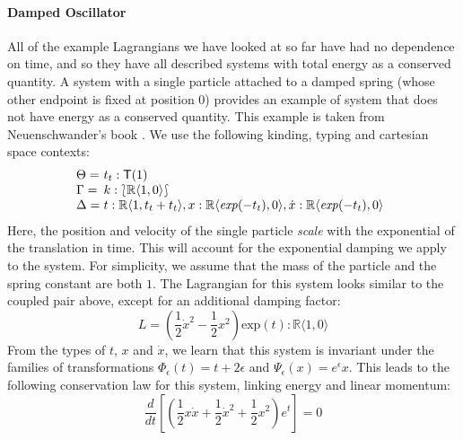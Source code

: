 \documentclass[preprint]{sigplanconf}
\newcommand{\typeOfCartSp}[1]{\lbag #1 \rbag}
\theoremstyle{examplestyle}
\begin{document}

\paragraph{Damped Oscillator} All of the example Lagrangians we have
looked at so far have had no dependence on time, and so they have all
described systems with total energy as a conserved quantity. A system
with a single particle attached to a damped spring (whose other
endpoint is fixed at position $0$) provides an example of system that
does not have energy as a conserved quantity. This example is taken
from Neuenschwander's book \cite{neuenschwander11}.  We use the
following kinding, typing and cartesian space contexts:
\begin{displaymath}
  \begin{array}{l@{\hspace{0.3em}}l}
    \Theta = & t_t : \mathsf{T}(1) \\
    \Gamma = & k : \typeOfCartSp{\mathbb{R}\langle 1, 0 \rangle} \\
    \Delta = &
    \begin{array}[t]{@{}l}
      t : \mathbb{R}\langle 1, t_t + t_t \rangle, x : \mathbb{R}\langle \mathit{exp}(-t_t), 0 \rangle, \dot{x} : \mathbb{R}\langle \mathit{exp}(-t_t), 0 \rangle
    \end{array}
  \end{array}
\end{displaymath}
Here, the position and velocity of the single particle \emph{scale}
with the exponential of the translation in time. This will account for
the exponential damping we apply to the system. For simplicity, we
assume that the mass of the particle and the spring constant are both
$1$. The Lagrangian for this system looks similar to the coupled pair
above, except for an additional damping factor:
\begin{displaymath}
  L = \left(\frac{1}{2}\dot{x}^2 - \frac{1}{2}x^2\right)\mathrm{exp}(t) : \mathbb{R}\langle 1, 0 \rangle
\end{displaymath}
From the types of $t$, $x$ and $\dot{x}$, we learn that this system is
invariant under the families of transformations $\Phi_\epsilon(t) = t
+ 2\epsilon$ and $\Psi_\epsilon(x) = e^\epsilon x$. This leads to the
following conservation law for this system, linking energy and linear
momentum:
\begin{displaymath}
  \frac{d}{dt}\left[\left(\frac{1}{2}x\dot{x} + \frac{1}{2}\dot{x}^2 + \frac{1}{2}x^2\right)e^t\right] = 0
\end{displaymath}
\end{document}
